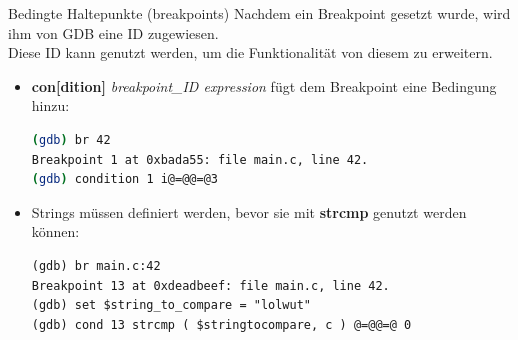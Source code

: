 
\begin{frame}[fragile]{Bedingte Haltepunkte (breakpoints)}
Nachdem ein Breakpoint gesetzt wurde, wird ihm von GDB eine ID zugewiesen.\\
Diese ID kann genutzt werden, um die Funktionalit\"at von diesem zu erweitern.
	\begin{itemize}
		\item \textbf{con[dition]} \textit{breakpoint\_ID expression} f\"ugt dem Breakpoint eine Bedingung hinzu:
		\begin{lstlisting}[numbers=none,language=bash]
(gdb) br 42
Breakpoint 1 at 0xbada55: file main.c, line 42.
(gdb) condition 1 i@=@@=@3
\end{lstlisting}
		\item Strings m\"ussen definiert werden, bevor sie mit \textbf{strcmp} genutzt werden k\"onnen:
		\begin{lstlisting}
(gdb) br main.c:42
Breakpoint 13 at 0xdeadbeef: file main.c, line 42.
(gdb) set $string_to_compare = "lolwut"
(gdb) cond 13 strcmp ( $stringtocompare, c ) @=@@=@ 0
\end{lstlisting}
	\end{itemize}
\end{frame}


